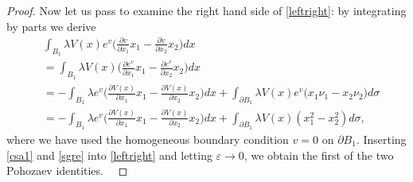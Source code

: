 \documentclass[reqno,11pt]{amsart}
\theoremstyle{definition}
\numberwithin{equation}{section}
\newcommand{\la}{\lambda}
\newcommand{\e}{\varepsilon}
\renewcommand{\(}{\left(}
\renewcommand{\)}{\right)}
\renewcommand{\[}{\left[}
\renewcommand{\]}{\right]}
\newcommand{\beq}{\begin{equation}}
\newcommand{\eeq}{\end{equation}}
\begin{document}
{\begin{proof}
Now let us pass to examine the right hand side of \eqref{leftright}: by integrating by parts we derive
\beq\label{sgre}\begin{aligned}&\int_{B_1} \la  V(x) e^{v}\bigg(\frac{\partial v}{\partial x_1}x_1-\frac{\partial v}{\partial x_2}x_2\bigg)  dx
 \\&=\int_{B_1} \la V(x) \bigg(\frac{\partial e^v}{\partial x_1}x_1-\frac{\partial e^v}{\partial x_2}x_2\bigg)dx\\ &=
-\int_{B_1} \la e^{v}\bigg(\frac{\partial V(x)}{\partial x_1}x_1-\frac{\partial V(x)}{\partial x_2}x_2\bigg) dx
+\int_{\partial B_1}\la  V(x)e^v \Big(x_1\nu_1-x_2\nu_2\Big)d\sigma
\\ &=
-\int_{B_1} \la e^{v}\bigg(\frac{\partial V(x)}{\partial x_1}x_1-\frac{\partial V(x)}{\partial x_2}x_2\bigg) dx
+\int_{\partial B_1}\la  V(x)(x_1^2-x_2^2)d\sigma ,\end{aligned}\eeq  where we have used the homogeneous boundary condition $v=0$ on $\partial B_1$. 
Inserting \eqref{csa1} and \eqref{sgre} into \eqref{leftright} and letting $\e\to 0$,  we obtain the  first of the two Pohozaev identities. 
\


\end{proof}}
\end{document}

